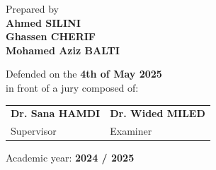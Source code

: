 \vspace{0.5cm}

\begin{center}
  \small Prepared by \\[0.1cm]
  \normalsize\textbf{Ahmed SILINI} \\
  \normalsize\textbf{Ghassen CHERIF} \\
  \normalsize\textbf{Mohamed Aziz BALTI}
\end{center}

\vspace{0.5cm}

\begin{center}
  \small Defended on the \textbf{4th of May 2025} \\
  \small in front of a jury composed of:
\end{center}

\vspace{0.3cm}

\begin{center}
\begin{tabular}{m{5.5cm} m{5.5cm}}
\centering\arraybackslash \small\textbf{Dr. Sana HAMDI} & \centering\arraybackslash \small\textbf{Dr. Wided MILED} \\
\centering\arraybackslash \footnotesize Supervisor & \centering\arraybackslash \footnotesize Examiner \\
\end{tabular}
\end{center}

\vspace{0.4cm}

\begin{center}
  \small Academic year: \textbf{2024 / 2025}
\end{center}

\vspace*{\fill} %

\newpage
\thispagestyle{empty}
\null
\newpage